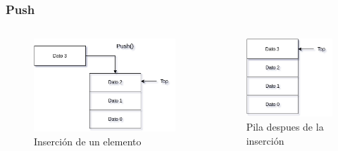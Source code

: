 \documentclass{beamer}
\begin{document}
\begin{frame}
    \frametitle{Push}
    
    \begin{columns}[b]
    \begin{figure}
    \includegraphics[width =0.9 \textwidth]{images/push1}
    \caption{Inserción de un elemento}
    \end{figure}
   
    \begin{figure}
    \includegraphics[width =0.65 \textwidth]{images/push2}
    \caption{Pila despues de la inserción}
    \end{figure}
   \end{columns}
    
\end{frame}
\end{document}
